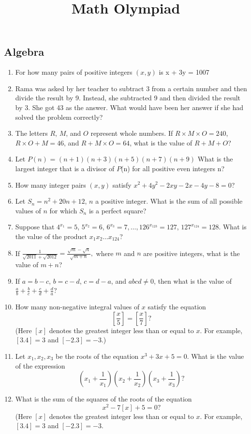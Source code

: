 \documentclass[12pt,-letter paper]{article}
\title{\textbf{Math Olympiad}}
\date{}
\providecommand{\brak}[1]{\ensuremath{\left(#1\right)}}
\providecommand{\sbrak}[1]{\ensuremath{{}\left[#1\right]}}
\begin{document}
\maketitle{}
\begin{center}
\section*{Algebra}
\end{center}
\begin{enumerate}
\item For how many pairs of positive integers \brak{x, y} is x + 3y = 1007
\item Rama was asked by her teacher to subtract 3 from a certain number and then divide the result by 9. Instead, she subtracted 9 and then divided the result by 3. She got 43 as the answer. What would have been her answer if she had solved the problem correctly?
\item The letters $R$, $M$, and $O$ represent whole numbers. If $R \times M \times O = 240$, $R \times O + M = 46$, and $R + M \times O = 64$, what is the value of $R + M + O$?
\item Let $P$\brak{n} = \brak{n + 1}\brak{n + 3}\brak{n + 5}\brak{n + 7}\brak{n + 9} What is the largest integer that is a divisor of $P$(n) for all positive even integers n?
\item How many integer pairs \brak{x, y} satisfy $ x ^ 2 + 4y ^ 2 - 2xy - 2x - 4y - 8 =0 $?
\item Let $S_n = n^2 + 20n + 12$, $n$ a positive integer. What is the sum of all possible values of $n$ for which $S_n$ is a perfect square?
\item Suppose that $4^{x_1} = 5$, $5^{x_2} = 6$, $6^{x_3} = 7, \ldots, 126^{x_{123}} = 127$, $127^{x_{124}} = 128$. What is the value of the product $x_1 x_2 \ldots x_{124}$?
\item If
	$\frac{1}{\sqrt{2011} + \sqrt{2012}} = \frac{\sqrt{m} - \sqrt{n}}{\sqrt{m+n}},$
where $m$ and $n$ are positive integers, what is the value of $m + n$?
\item If $a = b - c$, $b = c - d$, $c = d - a$, and $abcd \neq 0$, then what is the value of $\frac{a}{b} + \frac{b}{c} + \frac{c}{d} + \frac{d}{a}$? 
\item How many non-negative integral values of $x$ satisfy the equation
    \[
    \sbrak{\frac{x}{5}} = \sbrak{\frac{x}{7}}?
    \]
    (Here $\sbrak{x}$ denotes the greatest integer less than or equal to $x$. For example, $\sbrak{3.4} = 3$ and $\sbrak{-2.3} = -3$.)
\item Let $x_1, x_2, x_3$ be the roots of the equation $x^3 + 3x + 5 = 0$. What is the value of the expression\[ \brak{ x_1 + \frac{1}{x_1} } \brak{ x_2 + \frac{1}{x_2} }\brak{ x_3 + \frac{1}{x_3}}? \]
\item What is the sum of the squares of the roots of the equation
    \[
	x^2 - 7\sbrak {x} + 5 = 0?
    \]
(Here $\sbrak{x}$ denotes the greatest integer less than or equal to $x$. For example, $\sbrak {3.4} = 3$ and $\sbrak{ -2.3} = -3$.
\end{enumerate}
\end{document}
